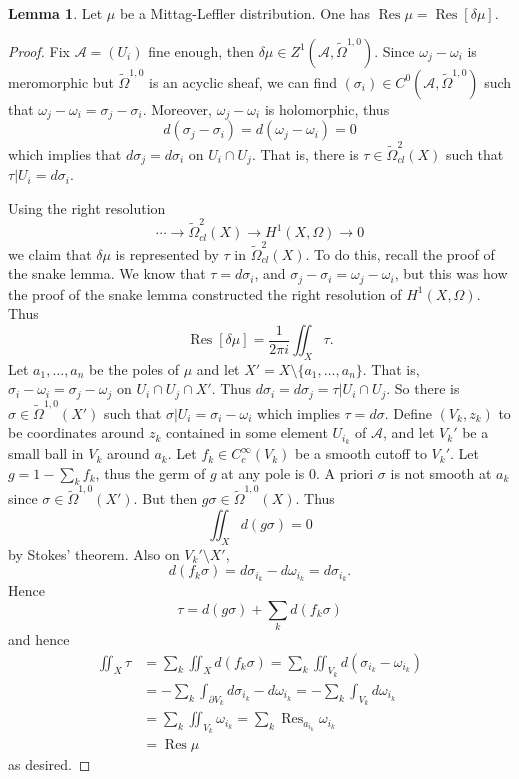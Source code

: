 \documentclass[12pt]{book}
\DeclareMathOperator{\Res}{Res}
\theoremstyle{definition}
\newtheorem{lemma}[theorem]{Lemma}
\begin{document}
\begin{lemma}
\label{Serre theorem 1}
Let $\mu$ be a Mittag-Leffler distribution.
One has $\Res \mu = \Res [\delta \mu]$.
\end{lemma}
\begin{proof}
Fix $\mathscr A = (U_i)$ fine enough, then $\delta \mu \in Z^1(\mathscr A, \tilde \Omega^{1, 0})$.
Since $\omega_j - \omega_i$ is meromorphic but $\tilde \Omega^{1, 0}$ is an acyclic sheaf, we can find $(\sigma_i) \in C^0(\mathscr A, \tilde \Omega^{1, 0})$ such that $\omega_j - \omega_i = \sigma_j - \sigma_i$.
Moreover, $\omega_j - \omega_i$ is holomorphic, thus
$$d(\sigma_j - \sigma_i) = d(\omega_j - \omega_i) = 0$$
which implies that $d\sigma_j = d\sigma_i$ on $U_i \cap U_j$.
That is, there is $\tau \in \tilde \Omega_{cl}^2(X)$ such that $\tau|U_i = d\sigma_i$.

Using the right resolution
$$\cdots \to \tilde \Omega^2_{cl}(X) \to H^1(X, \Omega) \to 0$$
we claim that $\delta \mu$ is represented by $\tau$ in $\tilde \Omega^2_{cl}(X)$.
To do this, recall the proof of the snake lemma.
We know that $\tau = d\sigma_i$, and $\sigma_j - \sigma_i = \omega_j - \omega_i$, but this was how the proof of the snake lemma constructed the right resolution of $H^1(X, \Omega)$.
Thus
$$\Res [\delta \mu] = \frac{1}{2\pi i} \iint_X \tau.$$
Let $a_1, \dots, a_n$ be the poles of $\mu$ and let $X' = X \setminus \{a_1, \dots, a_n\}$.
That is, $\sigma_i - \omega_i = \sigma_j - \omega_j$ on $U_i \cap U_j \cap X'$.
Thus $d\sigma_i = d\sigma_j = \tau|U_i \cap U_j$.
So there is $\sigma \in \tilde \Omega^{1, 0}(X')$ such that $\sigma|U_i = \sigma_i - \omega_i$ which implies $\tau = d\sigma$.
Define $(V_k, z_k)$ to be coordinates around $z_k$ contained in some element $U_{i_k}$ of $\mathscr A$, and let $V_k'$ be a small ball in $V_k$ around $a_k$.
Let $f_k \in C^\infty_c(V_k)$ be a smooth cutoff to $V_k'$.
Let $g = 1 - \sum_k f_k$, thus the germ of $g$ at any pole is $0$.
A priori $\sigma$ is not smooth at $a_k$ since $\sigma \in \tilde \Omega^{1, 0}(X')$.
But then $g\sigma \in \tilde \Omega^{1, 0}(X)$.
Thus
$$\iint_X d(g\sigma) = 0$$
by Stokes' theorem.
Also on $V_k' \setminus X'$,
$$d(f_k\sigma) = d\sigma_{i_k} - d\omega_{i_k} = d\sigma_{i_k}.$$
Hence
$$\tau = d(g\sigma) + \sum_k d(f_k\sigma)$$
and hence
\begin{align*}
\iint_X \tau &= \sum_k \iint_X d(f_k\sigma) = \sum_k \iint_{V_k} d(\sigma_{i_k} - \omega_{i_k})\\
&= -\sum_k \int_{\partial V_k} d\sigma_{i_k} - d\omega_{i_k} = -\sum_k \int_{V_k} d\omega_{i_k} \\
&= \sum_k \iint_{V_k} \omega_{i_k} = \sum_k \Res_{a_{i_k}} \omega_{i_k}\\
&= \Res \mu
\end{align*}
as desired.
\end{proof}
\end{document}
